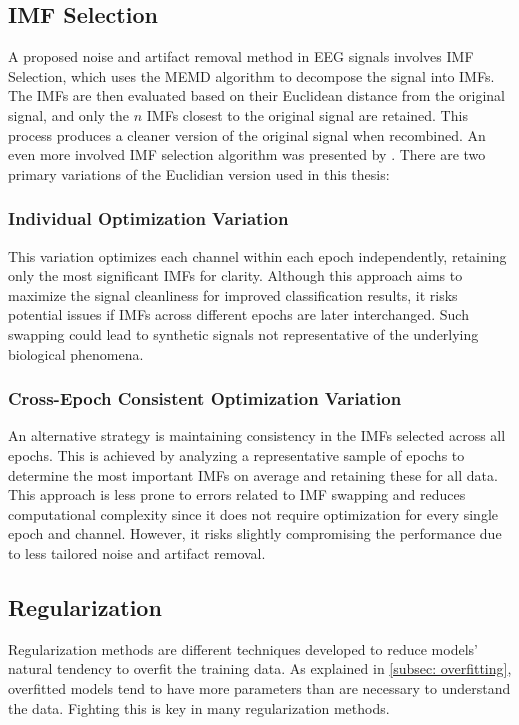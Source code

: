 \subsection{IMF Selection}
\label{subsec: img_selection}
A proposed noise and artifact removal method in EEG signals involves IMF Selection, which uses the MEMD algorithm to decompose the signal into IMFs. The IMFs are then evaluated based on their Euclidean distance from the original signal, and only the \(n\) IMFs closest to the original signal are retained. This process produces a cleaner version of the original signal when recombined. An even more involved IMF selection algorithm was presented by \cite{SinghMoore2023}. There are two primary variations of the Euclidian version used in this thesis: 

\subsubsection{Individual Optimization Variation}
This variation optimizes each channel within each epoch independently, retaining only the most significant IMFs for clarity. Although this approach aims to maximize the signal cleanliness for improved classification results, it risks potential issues if IMFs across different epochs are later interchanged. Such swapping could lead to synthetic signals not representative of the underlying biological phenomena.

\subsubsection{Cross-Epoch Consistent Optimization Variation}
An alternative strategy is maintaining consistency in the IMFs selected across all epochs. This is achieved by analyzing a representative sample of epochs to determine the most important IMFs on average and retaining these for all data. This approach is less prone to errors related to IMF swapping and reduces computational complexity since it does not require optimization for every single epoch and channel. However, it risks slightly compromising the performance due to less tailored noise and artifact removal.

\subsection{Regularization}
\label{subsec: regularization}
Regularization methods are different techniques developed to reduce models' natural tendency to overfit the training data\cite{TIAN2022146}. As explained in \autoref{subsec: overfitting}, overfitted models tend to have more parameters than are necessary to understand the data. Fighting this is key in many regularization methods.

